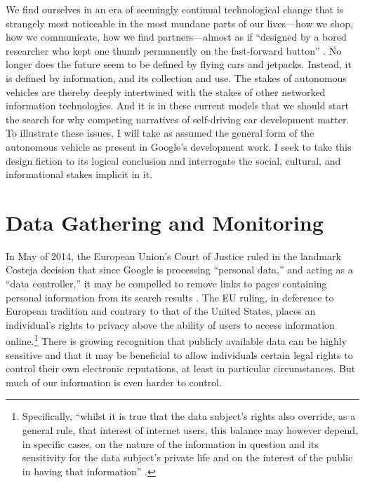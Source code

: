 We find ourselves in an era of seemingly continual technological
change that is strangely most noticeable in the most mundane parts of
our lives---how we shop, how we communicate, how we find
partners---almost as if ``designed by a bored researcher who kept one
thumb permanently on the fast-forward button'' \cite[p.
  7]{Neuromancer1984}. No longer does the future seem to be
defined by flying cars and jetpacks. Instead, it is defined by
information, and its collection and use. The stakes of autonomous
vehicles are thereby deeply intertwined with the
stakes of other networked information technologies. And it is in these
current models that we should start the search for why competing
narratives of self-driving car development matter. To illustrate these
issues, I will
take as assumed the general form of the autonomous vehicle as present
in Google's development work. I seek to take this design fiction
to its logical conclusion and interrogate the social,
cultural, and informational stakes implicit in it.


\section{Data Gathering and Monitoring} 


 In May of 2014, the European
Union's Court of Justice 
ruled in the landmark Costeja decision that since Google is processing
``personal data,'' and acting as a ``data controller,'' it may be
compelled to remove links to pages containing personal information
from its search results \cite{ICO}. The EU ruling, in deference to European
tradition and contrary to that of the United States, places an
individual's rights to privacy above the ability of users to access
information online.\footnote{Specifically, ``whilst it is true that the
data subject's rights also override, as a general rule, that interest
of internet users, this balance may however depend, in specific cases,
on the nature of the information in question and its sensitivity for
the data subject's private life and on the interest of the public in
having that information'' \cite{COJCosteja}.} There is growing recognition that publicly
available data can be highly sensitive and that it may be beneficial
to allow individuals certain legal rights to control their own
electronic reputations, at least in particular circumstances. But much of our
information is even harder to control.

